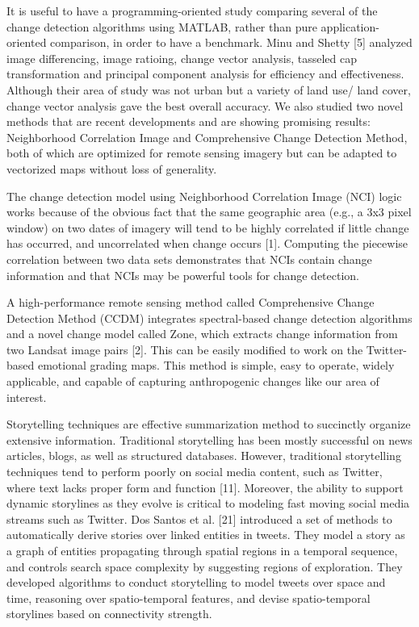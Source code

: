 \documentclass[conference]{IEEEtran}
\begin{document}
It is useful to have a programming-oriented study comparing several of the change detection algorithms using MATLAB, rather than pure application-oriented comparison, in order to have a benchmark. Minu and Shetty [5] analyzed image differencing, image ratioing, change vector analysis, tasseled cap transformation and principal component analysis for efficiency and effectiveness. Although their area of study was not urban but a variety of land use/ land cover, change vector analysis gave the best overall accuracy.
We also studied two novel methods that are recent developments and are showing promising results: Neighborhood Correlation Image and Comprehensive Change Detection Method, both of which are optimized for remote sensing imagery but can be adapted to vectorized maps without loss of generality.

The change detection model using Neighborhood Correlation Image (NCI) logic works because of the obvious fact that the same geographic area (e.g., a 3x3 pixel window) on two dates of imagery will tend to be highly correlated if little change has occurred, and uncorrelated when change occurs [1]. Computing the piecewise correlation between two data sets demonstrates that NCIs contain change information and that NCIs may be powerful tools for change detection.

A high-performance remote sensing method called Comprehensive Change Detection Method (CCDM) integrates spectral-based change detection algorithms and a novel change model called Zone, which extracts change information from two Landsat image pairs [2]. This can be easily modified to work on the Twitter-based emotional grading maps. This method is simple, easy to operate, widely applicable, and capable of capturing anthropogenic changes like our area of interest.

Storytelling techniques are effective summarization method to succinctly organize extensive information. Traditional storytelling has been mostly successful on news articles, blogs, as well as structured databases. However, traditional storytelling techniques tend to perform poorly on social media content, such as Twitter, where text lacks proper form and function [11]. Moreover, the ability to support dynamic storylines as they evolve is critical to modeling fast moving social media streams such as Twitter. Dos Santos et al. [21] introduced a set of methods to automatically derive stories over linked entities in tweets. They model a story as a graph of entities propagating through spatial regions in a temporal sequence, and controls search space complexity by suggesting regions of exploration. They developed algorithms to conduct storytelling to model tweets over space and time, reasoning over spatio-temporal features, and devise spatio-temporal storylines based on connectivity strength.
\end{document}
